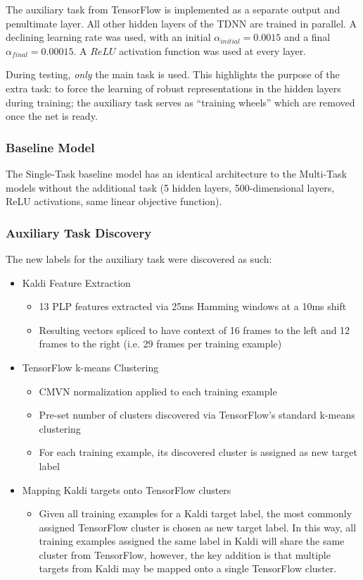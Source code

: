 \documentclass[a4paper]{article}
\begin{document}
The auxiliary task from TensorFlow is implemented as a separate output and penultimate layer. All other hidden layers of the TDNN are trained in parallel. A declining learning rate was used, with an initial $\alpha_{initial}=0.0015$ and a final $\alpha_{final}=0.00015$. A $ReLU$ activation function was used at every layer.

During testing, \textit{only} the main task is used. This highlights the purpose of the extra task: to force the learning of robust representations in the hidden layers during training; the auxiliary task serves as ``training wheels'' which are removed once the net is ready.


\subsubsection{Baseline Model}

The Single-Task baseline model has an identical architecture to the Multi-Task models without the additional task (5 hidden layers, 500-dimensional layers, ReLU activations, same linear objective function).
\subsubsection{Auxiliary Task Discovery}

The new labels for the auxiliary task were discovered as such:

\begin{itemize}
\item Kaldi Feature Extraction
  \begin{itemize}
  \item 13 PLP features extracted via 25ms Hamming windows at a 10ms shift
  \item Resulting vectors spliced to have context of 16 frames to the left and 12 frames to the right (i.e. 29 frames per training example)
  \end{itemize}

\item TensorFlow k-means Clustering
  \begin{itemize}
  \item CMVN normalization applied to each training example
  \item Pre-set number of clusters discovered via TensorFlow's standard k-means clustering
  \item For each training example, its discovered cluster is assigned as new target label
  \end{itemize}

\item Mapping Kaldi targets onto TensorFlow clusters
   \begin{itemize}
   \item Given all training examples for a Kaldi target label, the most commonly assigned TensorFlow cluster is chosen as new target label. In this way, all training examples assigned the same label in Kaldi will share the same cluster from TensorFlow, however, the key addition is that multiple targets from Kaldi may be mapped onto a single TensorFlow cluster.
  \end{itemize} 
\end{itemize}
\end{document}

